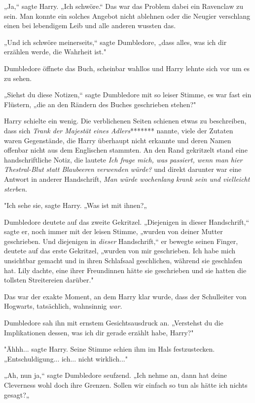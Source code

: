{„Ja,“ sagte Harry. „Ich schwöre.“ Das war das Problem dabei ein Ravenclaw zu sein. Man konnte ein solches Angebot nicht ablehnen oder die Neugier verschlang einen bei lebendigem Leib und alle anderen wussten das.

„Und ich schwöre meinerseits,“ sagte Dumbledore, „dass alles, was ich dir erzählen werde, die Wahrheit ist."

Dumbledore öffnete das Buch, scheinbar wahllos und Harry lehnte sich vor um es zu sehen.

„Siehst du diese Notizen,“ sagte Dumbledore mit so leiser Stimme, es war fast ein Flüstern, „die an den Rändern des Buches geschrieben stehen?"

Harry schielte ein wenig. Die verblichenen Seiten schienen etwas zu beschreiben, dass sich \emph{Trank der Majestät eines Adlers}******* nannte, viele der Zutaten waren Gegenstände, die Harry überhaupt nicht erkannte und deren Namen offenbar nicht aus dem Englischen stammten. An den Rand gekritzelt stand eine handschriftliche Notiz, die lautete \emph{Ich frage mich, was passiert, wenn man hier Thestral-Blut statt Blaubeeren verwenden würde?} und direkt darunter war eine Antwort in anderer Handschrift, \emph{Man würde wochenlang krank sein und vielleicht sterben.}

"Ich sehe sie, sagte Harry. „Was ist mit ihnen?„

Dumbledore deutete auf das zweite Gekritzel. „Diejenigen in dieser Handschrift,“ sagte er, noch immer mit der leisen Stimme, „wurden von deiner Mutter geschrieben. Und diejenigen in \emph{dieser} Handschrift,“ er bewegte seinen Finger, deutete auf das erste Gekritzel, „wurden von mir geschrieben. Ich habe mich unsichtbar gemacht und in ihren Schlafsaal geschlichen, während sie geschlafen hat. Lily dachte, eine ihrer Freundinnen hätte sie geschrieben und sie hatten die tollsten Streitereien darüber."

Das war der exakte Moment, an dem Harry klar wurde, dass der Schulleiter von Hogwarts, tatsächlich, wahnsinnig \emph{war.}

Dumbledore sah ihn mit ernstem Gesichtsausdruck an. „Verstehst du die Implikationen dessen, was ich dir gerade erzählt habe, Harry?"

"Ähhh... sagte Harry. Seine Stimme schien ihm im Hals festzustecken. „Entschuldigung... ich... nicht wirklich..."

„Ah, nun ja,“ sagte Dumbledore seufzend. „Ich nehme an, dann hat deine Cleverness wohl doch ihre Grenzen. Sollen wir einfach so tun als hätte ich nichts gesagt?„

}
